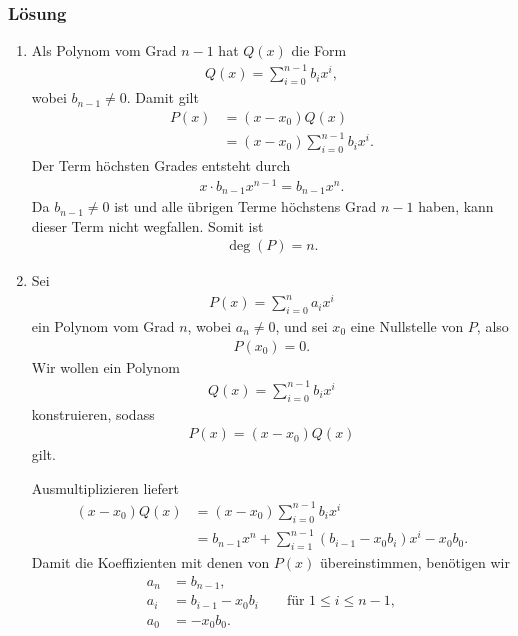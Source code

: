 \documentclass[a4paper,10pt]{article}
\newcommand{\s}[1]{#1}
\begin{document}
\s{\subsubsection*{Lösung}
\begin{enumerate}[label=(\alph*)]

    \item
    Als Polynom vom Grad $n-1$ hat $Q(x)$ die Form
    \begin{align*}
        Q(x)=\sum_{i=0}^{n-1} b_i x^i,
    \end{align*}
    wobei $b_{n-1}\neq 0$. Damit gilt
    \begin{align*}
        P(x)
        &=(x-x_0)Q(x)\\
        &=(x-x_0)\sum_{i=0}^{n-1}b_i x^i.
    \end{align*}
    Der Term höchsten Grades entsteht durch
    \begin{align*}
        x\cdot b_{n-1}x^{n-1}=b_{n-1}x^n.
    \end{align*}
    Da $b_{n-1}\neq0$ ist und alle übrigen Terme höchstens Grad $n-1$ haben, kann dieser Term nicht wegfallen. Somit ist
    \begin{align*}
        \deg(P)=n.
    \end{align*}

    \item
    Sei
    \begin{align*}
        P(x)=\sum_{i=0}^{n}a_i x^i
    \end{align*}
    ein Polynom vom Grad $n$, wobei $a_n\neq0$, und sei $x_0$ eine Nullstelle von $P$, also
    \begin{align*}
        P(x_0)=0.
    \end{align*}
    Wir wollen ein Polynom
    \begin{align*}
        Q(x)=\sum_{i=0}^{n-1}b_i x^i
    \end{align*}
    konstruieren, sodass
    \begin{align*}
        P(x)=(x-x_0)Q(x)
    \end{align*}
    gilt.

    Ausmultiplizieren liefert
    \begin{align*}
        (x-x_0)Q(x)
        &= (x-x_0)\sum_{i=0}^{n-1}b_i x^i\\
        &= b_{n-1}x^n
        +\sum_{i=1}^{n-1}(b_{i-1}-x_0b_i)x^i
        -x_0b_0.
    \end{align*}
    Damit die Koeffizienten mit denen von $P(x)$ übereinstimmen, benötigen wir
    \begin{align*}
        a_n &= b_{n-1},\\
        a_i &= b_{i-1}-x_0b_i
        \qquad\text{für }1\le i\le n-1,\\
        a_0 &= -x_0b_0.
    \end{align*}


\end{enumerate}}
\end{document}
